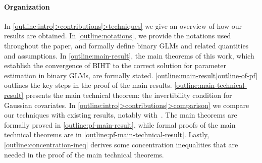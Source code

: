 \paragraph{Organization}
In \SECTION \ref{outline:intro|>contributions|>techniques} we give an overview of how our results are obtained. In \SECTION \ref{outline:notations}, we provide the notations used throughout the paper, and formally define binary GLMs and related quantities and assumptions.
In \SECTION \ref{outline:main-result}, the main theorems of this work, which establish the convergence of BIHT to the correct solution for parameter estimation in binary GLMs, are formally stated.
\SECTION \ref{outline:main-result|outline-of-pf} outlines the key steps in the proof of the main results.
\SECTION \ref{outline:main-technical-result} presents the main technical theorem: the invertibility condition for Gaussian covariates. %
In \APPENDIX \ref{outline:intro|>contributions|>comparison} we compare our techniques with existing results, notably with~\cite{matsumoto2022binary}. 
The main theorems are formally proved in \APPENDIX \ref{outline:pf-main-result}, while formal proofs of the main technical theorems are in \APPENDIX \ref{outline:pf-main-technical-result}.
Lastly, \APPENDIX \ref{outline:concentration-ineq} derives some concentration inequalities that are needed in the proof of the main technical theorems.
%
%

